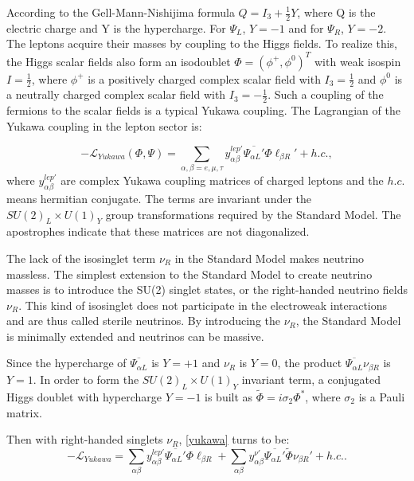 According to the Gell-Mann-Nishijima formula $Q=I_3+\frac{1}{2}Y$, where Q is the electric charge and Y is the hypercharge. For $\Psi_L$, $Y=-1$ and for $\Psi_R$, $Y=-2$. The leptons acquire their masses by coupling to the Higgs fields. To realize this, the Higgs scalar fields also form an isodoublet $\Phi = (\phi^+,\phi^0)^T$ with weak isospin $I=\frac{1}{2}$, where $\phi^+$ is a positively charged complex scalar field with $I_3=\frac{1}{2}$ and $\phi^0$ is a neutrally charged complex scalar field with $I_3=-\frac{1}{2}$. Such a coupling of the fermions to the scalar fields is a typical Yukawa coupling. The Lagrangian of the Yukawa coupling in the lepton sector is\cite{funchal2013physics}:

\begin{equation}\label{yukawa}
-\mathcal L_{Yukawa}(\Phi,\Psi) =\sum_{\alpha,\beta=e,\mu,\tau} y^{lep'}_{\alpha\beta} \overline{\Psi_{\alpha L}'}\Phi\ell_{\beta R}' + h.c.,
\end{equation}
where $y^{lep'}_{\alpha\beta}$ are complex Yukawa coupling matrices of charged leptons and the $h.c.$ means hermitian conjugate. The terms are invariant under the $SU(2)_L\times U(1)_Y$ group transformations required by the Standard Model. The apostrophes indicate that these matrices are not diagonalized.

The lack of the isosinglet term $\nu_R$ in the Standard Model makes neutrino massless. The simplest extension to the Standard Model to create neutrino masses is to introduce the SU(2) singlet states, or the right-handed neutrino fields $\nu_R$. This kind of isosinglet does not participate in the electroweak interactions and are thus called sterile neutrinos. By introducing the $\nu_R$, the Standard Model is minimally extended and neutrinos can be massive\cite{giunti2007fundamentals}.

Since the hypercharge of $\overline{\Psi_{\alpha L}}$ is $Y=+1$ and $\nu_R$ is $Y=0$, the product $\overline{\Psi_{\alpha L}}\nu_{\beta R}$ is $Y=1$. In order to form the $SU(2)_L\times U(1)_Y$ invariant term, a conjugated Higgs doublet with hypercharge $Y=-1$ is built as $\widetilde{\Phi}=i\sigma_2\Phi^*$, where $\sigma_2$ is a Pauli matrix\cite{giunti2007fundamentals}.

Then with right-handed singlets $\nu_R$, \ref{yukawa} turns to be\cite{giunti2007fundamentals,funchal2013physics}:
\begin{equation}\label{yukawa2}
-\mathcal{L}_{Yukawa} =  \sum_{\alpha\beta} y^{lep'}_{\alpha\beta} \overline{\Psi_{\alpha L}'}\Phi\ell_{\beta R} + \sum_{\alpha\beta} y^{\nu'}_{\alpha\beta} \overline{\Psi_{\alpha L}'}\widetilde{\Phi}\nu_{\beta R}'+h.c..
\end{equation}


